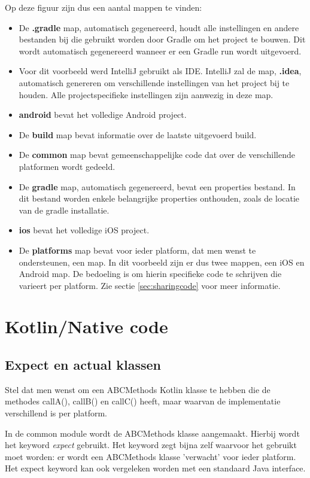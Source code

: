 Op deze figuur zijn dus een aantal mappen te vinden:
\begin{itemize}
	\item De \textbf{.gradle} map, automatisch gegenereerd, houdt alle instellingen en andere bestanden bij die gebruikt worden door Gradle om het project te bouwen. Dit wordt automatisch gegenereerd wanneer er een Gradle run wordt uitgevoerd.
	\item Voor dit voorbeeld werd IntelliJ gebruikt als IDE. IntelliJ zal de map, \textbf{.idea}, automatisch genereren om verschillende instellingen van het project bij te houden. Alle projectspecifieke instellingen zijn aanwezig in deze map.
	\item \textbf{android} bevat het volledige Android project.
	\item De \textbf{build} map bevat informatie over de laatste uitgevoerd build.
	\item De \textbf{common} map bevat gemeenschappelijke code dat over de verschillende platformen wordt gedeeld.
	\item De \textbf{gradle} map, automatisch gegenereerd, bevat een properties bestand. In dit bestand worden enkele belangrijke properties onthouden, zoals de locatie van de gradle installatie.
	\item \textbf{ios} bevat het volledige iOS project.
	\item De \textbf{platforms} map bevat voor ieder platform, dat men wenst te ondersteunen, een map. In dit voorbeeld zijn er dus twee mappen, een iOS en Android map. De bedoeling is om hierin specifieke code te schrijven die varieert per platform. Zie sectie \ref{sec:sharingcode} voor meer informatie.
\end{itemize}

\section{Kotlin/Native code}
\subsection {Expect en actual klassen}
\label{sec:expectandactual}
Stel dat men wenst om een ABCMethods Kotlin klasse te hebben die de methodes callA(), callB() en callC() heeft, maar waarvan de implementatie verschillend is per platform.

In de common module wordt de ABCMethods klasse aangemaakt. Hierbij wordt het keyword \textit{expect} gebruikt. Het keyword zegt bijna zelf waarvoor het gebruikt moet worden: er wordt een ABCMethods klasse 'verwacht' voor ieder platform. Het expect keyword kan ook vergeleken worden met een standaard Java interface.

